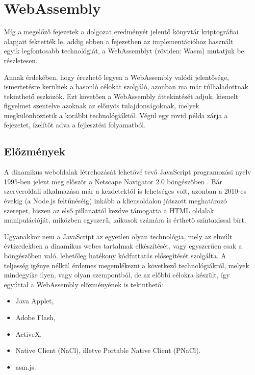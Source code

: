\chapter{WebAssembly}

Míg a megelőző fejezetek a dolgozat eredményét jelentő könyvtár kriptográfiai alapjait fektették le, addig ebben a fejezetben az implementációhoz használt egyik legfontosabb technológiát, a WebAssemblyt (röviden: Wasm) mutatjuk be részletesen. 

Annak érdekében, hogy érezhető legyen a WebAssembly valódi jelentősége, ismertetésre kerülnek a hasonló célokat szolgáló, azonban ma már túlhaladottnak tekinthető eszközök. Ezt követően a WebAssembly áttekintését adjuk, kiemelt figyelmet szentelve azoknak az előnyös tulajdonságoknak, melyek megkülönböztetik a korábbi technológiáktól. Végül egy rövid példa zárja a fejezetet, ízelítőt adva a fejlesztési folyamatból.

\section{Előzmények}

A dinamikus weboldalak létrehozását lehetővé tevő JavaScript programozási nyelv 1995-ben jelent meg először a Netscape Navigator 2.0 böngészőben \cite{JavaScriptAnnouncement}. Bár szerveroldali alkalmazása már a kezdetektől is lehetséges volt, azonban a 2010-es évekig (a Node.js feltűnéséig) inkább a kliensoldalon játszott meghatározó szerepet, hiszen az első pillanattól kezdve támogatta a HTML oldalak manipulációját, miközben egyszerű, laikusok számára is érthető szintaxissal bírt.

Ugyanakkor nem a JavaScript az egyetlen olyan technológia, mely az elmúlt évtizedekben a dinamikus webes tartalmak elkészítését, vagy egyszerűen csak a böngészőben való, lehetőleg hatékony kódfuttatás elősegítését szolgálta. A teljesség igénye nélkül érdemes megemlékezni a következő technológiákról, melyek mindegyike ilyen, vagy olyan szempontból, de az előbbi célokra készült, így egyúttal a WebAssembly előzményének is tekinthető:

\begin{itemize}
    \item
    Java Applet,

    \item
    Adobe Flash,

    \item
    ActiveX,

    \item
    Native Client (NaCl), illetve Portable Native Client (PNaCl),

    \item
    asm.js.
\end{itemize}

